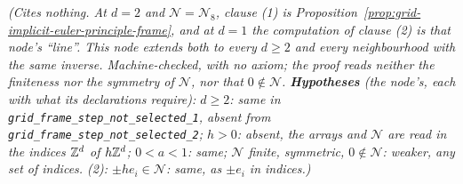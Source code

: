 \begin{proposition}
\statusT\quad\emph{(Cites nothing. At $d = 2$ and $\mathcal{N} = \mathcal{N}_8$, clause (1) is
Proposition~\ref{prop:grid-implicit-euler-principle-frame}, and at $d = 1$ the computation of
clause (2) is that node's ``line''. This node extends both to every $d \ge 2$ and every
neighbourhood with the same inverse. Machine-checked, with no axiom; the proof reads neither the
finiteness nor the symmetry of $\mathcal{N}$, nor that $0 \notin \mathcal{N}$.
\textbf{Hypotheses} (the node's, each with what its declarations require): $d \ge 2$: same in
\texttt{grid\_frame\_step\_not\_selected\_1}, absent from \texttt{grid\_frame\_step\_not\_selected\_2};
$h > 0$: absent, the arrays and $\mathcal{N}$ are read in the indices $\mathbb{Z}^d$ of $h\mathbb{Z}^d$;
$0 < a < 1$: same; $\mathcal{N}$ finite, symmetric, $0 \notin \mathcal{N}$: weaker, any set of
indices. (2): $\pm he_i \in \mathcal{N}$: same, as $\pm e_i$ in indices.)}
\end{proposition}

